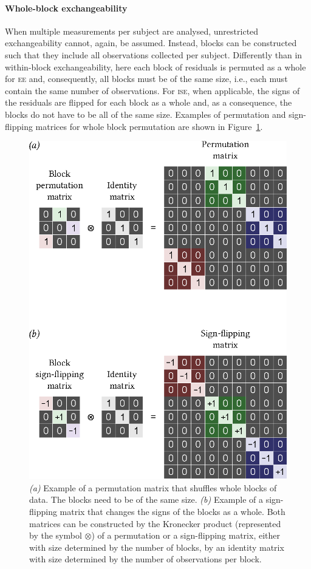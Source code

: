\paragraph{Whole-block exchangeability}

When multiple measurements per subject are analysed, unrestricted exchangeability cannot, again, be assumed. Instead, blocks can be constructed such that they include all observations collected per subject. Differently than in within-block exchangeability, here each block of residuals is permuted as a whole for \textsc{ee} and, consequently, all blocks must be of the same size, i.e., each must contain the same number of observations. For \textsc{ise}, when applicable, the signs of the residuals are flipped for each block as a whole and, as a consequence, the blocks do not have to be all of the same size. Examples of permutation and sign-flipping matrices for whole block permutation are shown in Figure~\ref{fig:whole-block}.

\begin{figure}[!p]
\centering
\includegraphics{images/whole-block.eps}
\caption[Example of whole-block permutation and sign-flipping matrices.]{\emph{(a)} Example of a permutation matrix that shuffles whole blocks of data. The blocks need to be of the same size. \emph{(b)} Example of a sign-flipping matrix that changes the signs of the blocks as a whole. Both matrices can be constructed by the Kronecker product (represented by the symbol $\otimes$) of a permutation or a sign-flipping matrix, either with size determined by the number of blocks, by an identity matrix with size determined by the number of observations per block.}
\label{fig:whole-block}
\end{figure}

